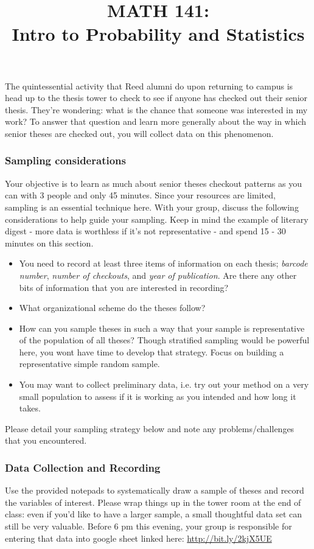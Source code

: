 \documentclass[10pt]{article}\usepackage[]{graphicx}\usepackage[]{color}
\title{MATH 141:\\Intro to Probability and Statistics}
\begin{document}
The quintessential activity that Reed alumni do upon returning to campus is head up to the thesis tower to check to see if anyone has checked out their senior thesis. They're wondering: what is the chance that someone was interested in my work? To answer that question and learn more generally about the way in which senior theses are checked out, you will collect data on this phenomenon.

\subsubsection*{Sampling considerations}
Your objective is to learn as much about senior theses checkout patterns as you can with 3 people and only 45 minutes. Since your resources are limited, sampling is an essential technique here. With your group, discuss the following considerations to help guide your sampling. Keep in mind the example of literary digest - more data is worthless if it's not representative - and spend 15 - 30 minutes on this section.

\begin{itemize}
\item You need to record at least three items of information on each thesis; \emph{barcode number}, \emph{number of checkouts}, and \emph{year of publication}. Are there any other bits of information that you are interested in recording?
\item What organizational scheme do the theses follow?
\item How can you sample theses in such a way that your sample is representative of the population of all theses? Though stratified sampling would be powerful here, you wont have time to develop that strategy. Focus on building a representative simple random sample.
\item You may want to collect preliminary data, i.e. try out your method on a very small population to assess if it is working as you intended and how long it takes.
\end{itemize}

Please detail your sampling strategy below and note any problems/challenges that you encountered.

\newpage

\subsubsection*{Data Collection and Recording}
Use the provided notepads to systematically draw a sample of theses and record the variables of interest. Please wrap things up in the tower room at the end of class: even if you'd like to have a larger sample, a small thoughtful data set can still be very valuable. Before 6 pm this evening, your group is responsible for entering that data into google sheet linked here: \url{http://bit.ly/2kjX5UE}
\end{document}
